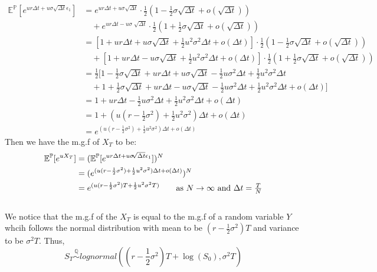 \documentclass[12pt, letterpaper]{article}
\begin{document}
\begin{align*}
  \mathbb{E}^\mathbb{P} [e^{u r\Delta t+u\sigma \sqrt{\Delta t} \epsilon_1}] &= e^{u r\Delta t +u\sigma \sqrt{\Delta t}} \cdot \frac{1}{2} (1 - \frac{1}{2}{\sigma} \sqrt{\Delta t} + o(\sqrt{\Delta t})) \\ 
    & \quad + e^{u r\Delta t-u\sigma \sqrt[]{\Delta t}} \cdot \frac{1}{2} (1 + \frac{1}{2}{\sigma} \sqrt{\Delta t} + o(\sqrt{\Delta t})) \\
    &= [1+u r\Delta t+u \sigma \sqrt{\Delta t} +\frac{1}{2}u^2\sigma^2\Delta t + o(\Delta t)] \cdot \frac{1}{2} (1 - \frac{1}{2}{\sigma} \sqrt{\Delta t} + o(\sqrt{\Delta t})) \\ 
    & \quad + [1+u r\Delta t-u \sigma \sqrt{\Delta t} +\frac{1}{2}u^2\sigma^2\Delta t + o(\Delta t)] \cdot \frac{1}{2} (1 + \frac{1}{2}{\sigma} \sqrt{\Delta t} + o(\sqrt{\Delta t})) \\
    &= \frac{1}{2}[1 - \frac{1}{2}\sigma\sqrt{\Delta t} + ur\Delta t + u\sigma \sqrt{\Delta t} - \frac{1}{2}u\sigma^2\Delta t + \frac{1}{2}u^2\sigma^2\Delta t \\
    & \quad + 1 + \frac{1}{2}\sigma\sqrt{\Delta t} + ur\Delta t - u\sigma \sqrt{\Delta t} - \frac{1}{2}u\sigma^2\Delta t + \frac{1}{2}u^2\sigma^2\Delta t + o(\Delta t)] \\
    &= 1 + ur\Delta t - \frac{1}{2} u\sigma^2\Delta t + \frac{1}{2}u^2\sigma^2\Delta t + o(\Delta t) \\
    &= 1 + (u(r-\frac{1}{2}\sigma^2) + \frac{1}{2}u^2\sigma^2) \Delta t + o(\Delta t) \\
    &= e^{(u(r-\frac{1}{2}\sigma^2) + \frac{1}{2}u^2\sigma^2) \Delta t + o(\Delta t)}
\end{align*}
Then we have the m.g.f of $X_T$ to be:
\begin{align*}
  \mathbb{E}^\mathbb{P}[e^{u X_T}] &= (\mathbb{E}^\mathbb{P} [e^{u r\Delta t+u\sigma \sqrt[]{\Delta t} \epsilon_1}])^N \\
  &= (e^{(u(r-\frac{1}{2}\sigma^2) + \frac{1}{2}u^2\sigma^2) \Delta t + o(\Delta t)})^N\\
  &= e^{(u(r - \frac{1}{2}\sigma^2)T + \frac{1}{2}u^2 \sigma^2T)} \tag*{as $N \rightarrow \infty$ and $\Delta t = \frac{T}{N}$}
\end{align*}
\\
We notice that the m.g.f of the $X_T$ is equal to the m.g.f of a random variable $Y$ whcih follows the normal distribution with mean to be $(r - \frac{1}{2}\sigma^2)T$ and
variance to be $\sigma^2 T$. Thus, 
\[ S_T \stackrel{\mathbb{Q}}{\sim} lognormal((r - \frac{1}{2}\sigma^2)T + \log(S_0), \sigma^2 T)\]
\end{document}
